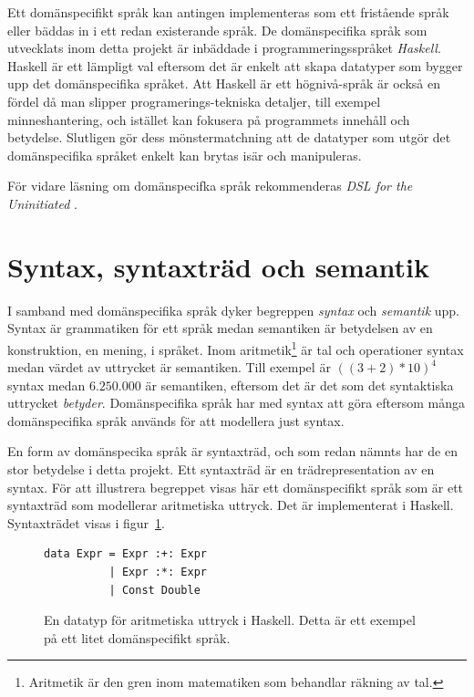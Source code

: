 \begin{draft}
Ett domänspecifikt språk kan antingen implementeras som ett fristående språk
eller bäddas in i ett redan existerande språk. De domänspecifika språk som
utvecklats inom detta projekt är inbäddade i programmeringsspråket
\textit{Haskell}. Haskell är ett lämpligt val eftersom det är enkelt att skapa
datatyper som bygger upp det domänspecifika språket. Att Haskell är ett
högnivå-språk är också en fördel då man slipper programerings-tekniska detaljer,
till exempel minneshantering, och istället kan fokusera på programmets innehåll
och betydelse. Slutligen gör dess mönstermatchning att de datatyper som utgör
det domänspecifika språket enkelt kan brytas isär och manipuleras.

För vidare läsning om domänspecifka språk rekommenderas \textit{DSL for the Uninitiated} \cite{DSLU}. 

\section{Syntax, syntaxträd och semantik}\label{sec:syntax}

I samband med domänspecifika språk dyker begreppen \textit{syntax} och
\textit{semantik} upp. Syntax är grammatiken för ett språk medan semantiken är
betydelsen av en konstruktion, en mening, i språket. Inom
aritmetik\footnote{Aritmetik är den gren inom matematiken som behandlar
räkning av tal.} är tal och operationer syntax medan värdet av uttrycket är semantiken.
Till exempel är $((3 + 2) * 10)^4$ syntax medan $6.250.000$ är semantiken,
eftersom det är det som det syntaktiska uttrycket \textit{betyder}.
Domänspecifika språk har med syntax att göra eftersom många domänspecifika språk
används för att modellera just syntax.

En form av domänspecika språk är syntaxträd, och som redan nämnts har de en stor
betydelse i detta projekt. Ett syntaxträd är en trädrepresentation av en syntax.
För att illustrera begreppet visas här ett domänspecifikt språk som är ett
syntaxträd som modellerar aritmetiska uttryck. Det är implementerat i Haskell.
Syntaxträdet visas i figur~\ref{fig:syntax_exempel}.

\begin{figure}[tph]
  \begin{lstlisting}
data Expr = Expr :+: Expr
          | Expr :*: Expr
          | Const Double
  \end{lstlisting}
  \caption{En datatyp för aritmetiska uttryck i Haskell. Detta är ett exempel på
           ett litet domänspecifikt språk.}\label{fig:syntax_exempel} 
\end{figure}


\end{draft}
